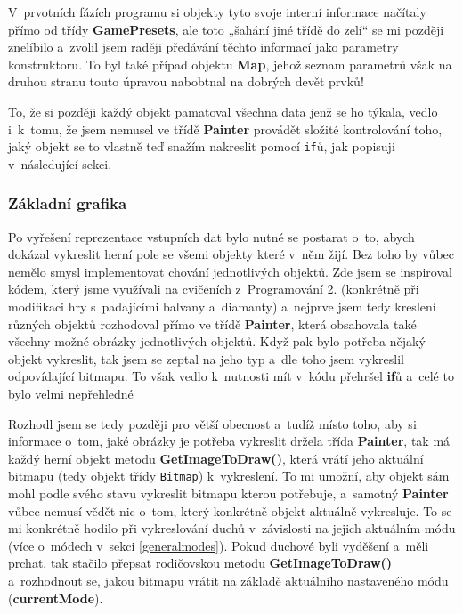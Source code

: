 \documentclass[a4]{article}
\begin{document}
V~prvotních fázích programu si objekty tyto svoje interní informace načítaly přímo od třídy \textbf{GamePresets}, ale toto „šahání jiné třídě do zelí“ se mi později znelíbilo a~zvolil jsem raději předávání těchto informací jako parametry konstruktoru. To byl také případ objektu \textbf{Map}, jehož seznam parametrů však na druhou stranu touto úpravou nabobtnal na dobrých devět prvků!

To, že si později každý objekt pamatoval všechna data jenž se ho týkala, vedlo i~k~tomu, že jsem nemusel ve třídě \textbf{Painter} provádět složité kontrolování toho, jaký objekt se to vlastně teď snažím nakreslit pomocí \verb|if|ů, jak popisuji v~následující sekci.

\subsubsection{Základní grafika} \label{staticgraphics}
Po vyřešení reprezentace vstupních dat bylo nutné se postarat o~to, abych dokázal vykreslit herní pole se všemi objekty které v~něm žijí. Bez toho by vůbec nemělo smysl implementovat chování jednotlivých objektů. Zde jsem se inspiroval kódem, který jsme využívali na cvičeních z~Programování 2. (konkrétně při modifikaci hry s~padajícími balvany a~diamanty) a~nejprve jsem tedy kreslení různých objektů rozhodoval přímo ve třídě \textbf{Painter}, která obsahovala také všechny možné obrázky jednotlivých objektů. Když pak bylo potřeba nějaký objekt vykreslit, tak jsem se zeptal na jeho typ a~dle toho jsem vykreslil odpovídající bitmapu. To však vedlo k~nutnosti mít v~kódu přehršel \textbf{if}ů a~celé to bylo velmi nepřehledné

Rozhodl jsem se tedy později pro větší obecnost a~tudíž místo toho, aby si informace o~tom, jaké obrázky je potřeba vykreslit držela třída \textbf{Painter}, tak má každý herní objekt metodu \textbf{GetImageToDraw()}, která vrátí jeho aktuální bitmapu (tedy objekt třídy \verb|Bitmap|) k~vykreslení. To mi umožní, aby objekt sám mohl podle svého stavu vykreslit bitmapu kterou potřebuje, a~samotný \textbf{Painter} vůbec nemusí vědět nic o~tom, který konkrétně objekt aktuálně vykresluje. To se mi konkrétně hodilo při vykreslování duchů v~závislosti na jejich aktuálním módu (více o~módech v~sekci \ref{generalmodes}). Pokud duchové byli vyděšení a~měli prchat, tak stačilo přepsat rodičovskou metodu \textbf{GetImageToDraw()} a~rozhodnout se, jakou bitmapu vrátit na základě aktuálního nastaveného módu (\textbf{currentMode}).
\end{document}
